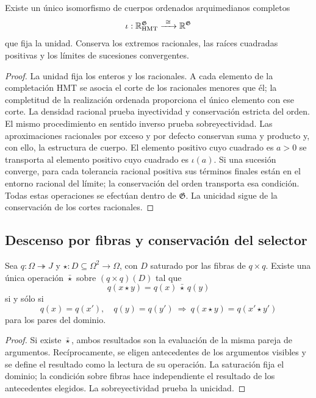 \begin{proposition}
\label{hmtfg:carta-interna}
Existe un único isomorfismo de cuerpos ordenados arquimedianos completos
\[
 \iota:\mathbb R_{\rm HMT}^{\mathfrak G}
             \xrightarrow{\ \cong\ }\mathbb R^{\mathfrak G}
\]
que fija la unidad. Conserva los extremos racionales, las raíces
cuadradas positivas y los límites de sucesiones convergentes.
\end{proposition}
\begin{proof}
La unidad fija los enteros y los racionales. A cada elemento de la
completación HMT se asocia el corte de los racionales menores que él;
la completitud de la realización ordenada proporciona el único elemento
con ese corte. La densidad racional prueba inyectividad y conservación
estricta del orden. El mismo procedimiento en sentido inverso prueba
sobreyectividad. Las aproximaciones racionales por exceso y por defecto
conservan suma y producto y, con ello, la estructura de cuerpo.
El elemento positivo cuyo cuadrado es \(a>0\) se transporta al elemento
positivo cuyo cuadrado es \(\iota(a)\). Si una sucesión converge, para
cada tolerancia racional positiva sus términos finales están en el
entorno racional del límite; la conservación del orden transporta esa
condición. Todas estas operaciones se efectúan dentro de
\(\mathfrak G\). La unicidad sigue de la conservación de los cortes
racionales.
\end{proof}

\subsection{Descenso por fibras y conservación del selector}
\label{hmtfg:descenso-selector}

\begin{proposition}
\label{hmtfg:criterio-descenso}
Sea \(q:\Omega\twoheadrightarrow J\) y
\(\star:D\subseteq\Omega^2\to\Omega\), con \(D\) saturado por las
fibras de \(q\times q\). Existe una única operación \(\bar\star\)
sobre \((q\times q)(D)\) tal que
\[
 q(x\star y)=q(x)\,\bar\star\,q(y)
\]
si y sólo si
\[
 q(x)=q(x'),\quad q(y)=q(y')
 \ \Longrightarrow\ q(x\star y)=q(x'\star y')
\]
para los pares del dominio.
\end{proposition}
\begin{proof}
Si existe \(\bar\star\), ambos resultados son la evaluación de la
misma pareja de argumentos. Recíprocamente, se eligen antecedentes
de los argumentos visibles y se define el resultado como la lectura
de su operación. La saturación fija el dominio; la condición sobre
fibras hace independiente el resultado de los antecedentes elegidos.
La sobreyectividad prueba la unicidad.
\end{proof}

